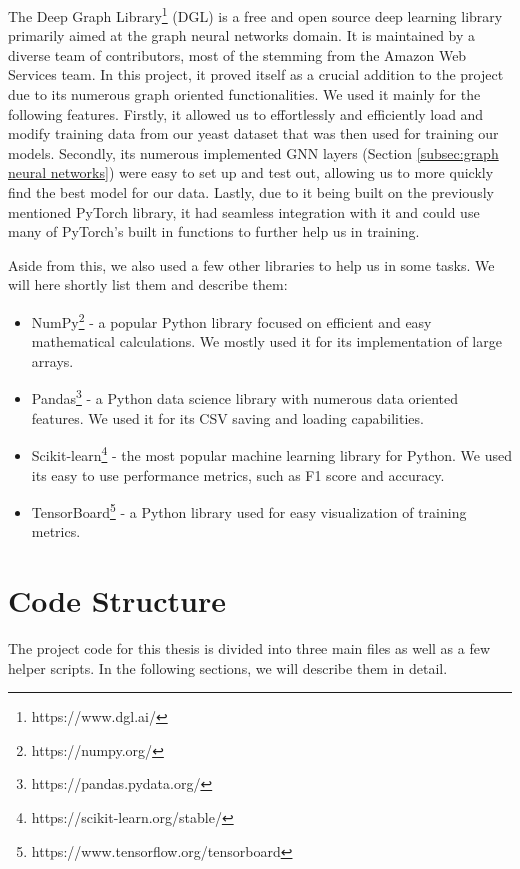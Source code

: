 \documentclass[times, utf8, diplomski, english]{fer_eng}
\begin{document}
The Deep Graph Library\footnote{https://www.dgl.ai/} (DGL) \cite{DGL} is a free and open source deep learning library primarily aimed at the graph neural networks domain. It is maintained by a diverse team of contributors, most of the stemming from the Amazon Web Services team. In this project, it proved itself as a crucial addition to the project due to its numerous graph oriented functionalities. We used it mainly for the following features. Firstly, it allowed us to effortlessly and efficiently load and modify training data from our yeast dataset that was then used for training our models. Secondly, its numerous implemented GNN layers (Section \ref{subsec:graph neural networks}) were easy to set up and test out, allowing us to more quickly find the best model for our data. Lastly, due to it being built on the previously mentioned PyTorch library, it had seamless integration with it and could use many of PyTorch's built in functions to further help us in training.

Aside from this, we also used a few other libraries to help us in some tasks. We will here shortly list them and describe them:
\begin{itemize}
	\item NumPy\footnote{https://numpy.org/} - a popular Python library focused on efficient and easy mathematical calculations. We mostly used it for its implementation of large arrays.
	\item Pandas\footnote{https://pandas.pydata.org/} - a Python data science library with numerous data oriented features. We used it for its CSV saving and loading capabilities.
	\item Scikit-learn\footnote{https://scikit-learn.org/stable/} - the most popular machine learning library for Python. We used its easy to use performance metrics, such as F1 score and accuracy.
	\item TensorBoard\footnote{https://www.tensorflow.org/tensorboard} - a Python library used for easy visualization of training metrics.
\end{itemize}

\section{Code Structure}
\label{sec:code structure}

The project code for this thesis is divided into three main files as well as a few helper scripts. In the following sections, we will describe them in detail.
\end{document}
